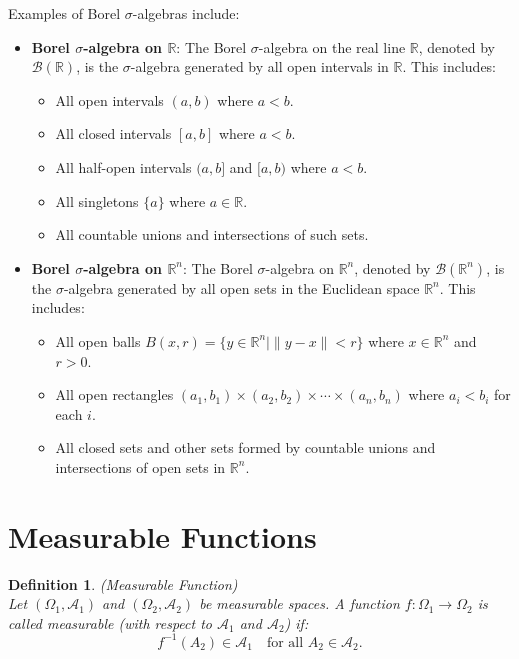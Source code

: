 \documentclass[11pt]{book}
\numberwithin{equation}{chapter}
\theoremstyle{boldStyle}
\newtheorem{definition}{Definition}[section]
\begin{document}
Examples of Borel \(\sigma\)-algebras include:

\begin{itemize}
    \item \textbf{Borel \(\sigma\)-algebra on \(\mathbb{R}\)}: The Borel \(\sigma\)-algebra on the real line \(\mathbb{R}\), denoted by \(\mathcal{B}(\mathbb{R})\), is the \(\sigma\)-algebra generated by all open intervals in \(\mathbb{R}\). This includes:
    \begin{itemize}
        \item All open intervals \((a, b)\) where \(a < b\).
        \item All closed intervals \([a, b]\) where \(a < b\).
        \item All half-open intervals \((a, b]\) and \([a, b)\) where \(a < b\).
        \item All singletons \(\{a\}\) where \(a \in \mathbb{R}\).
        \item All countable unions and intersections of such sets.
    \end{itemize}

    \item \textbf{Borel \(\sigma\)-algebra on \(\mathbb{R}^n\)}: The Borel \(\sigma\)-algebra on \(\mathbb{R}^n\), denoted by \(\mathcal{B}(\mathbb{R}^n)\), is the \(\sigma\)-algebra generated by all open sets in the Euclidean space \(\mathbb{R}^n\). This includes:
    \begin{itemize}
        \item All open balls \(B(x, r) = \{ y \in \mathbb{R}^n \mid \|y - x\| < r \}\) where \(x \in \mathbb{R}^n\) and \(r > 0\).
        \item All open rectangles \((a_1, b_1) \times (a_2, b_2) \times \cdots \times (a_n, b_n)\) where \(a_i < b_i\) for each \(i\).
        \item All closed sets and other sets formed by countable unions and intersections of open sets in \(\mathbb{R}^n\).
    \end{itemize}
\end{itemize}



\section{Measurable Functions}

\begin{definition}(Measurable Function) \\
    Let \((\Omega_1, \mathcal{A}_1)\) and \((\Omega_2, \mathcal{A}_2)\) be measurable spaces. 
    A function \(f: \Omega_1 \to \Omega_2\) is called measurable (with respect to \(\mathcal{A}_1\) and \(\mathcal{A}_2\)) if:
    \[
    f^{-1}(A_2) \in \mathcal{A}_1 \quad \text{for all } A_2 \in \mathcal{A}_2.
    \]
\end{definition}
\end{document}
